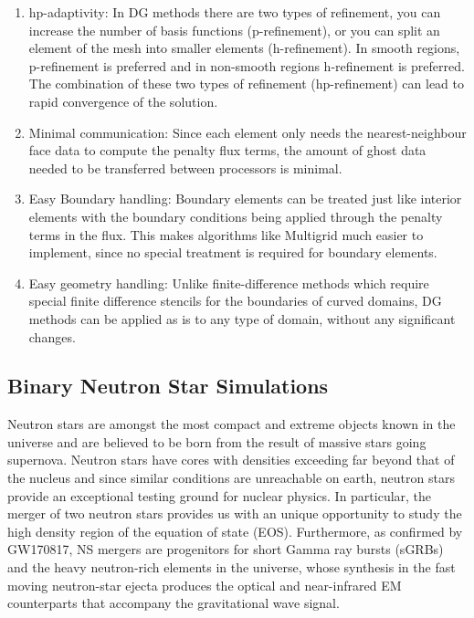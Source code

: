 \begin{enumerate}
\item hp-adaptivity: In DG methods there are two types of refinement, you can increase the number of basis functions (p-refinement), or you can split an element of the mesh into smaller elements (h-refinement). In smooth regions, p-refinement is preferred and in non-smooth regions h-refinement is preferred. The combination of these two types of refinement (hp-refinement) can lead to rapid convergence of the solution.
\item Minimal communication: Since each element only needs the nearest-neighbour face data to compute the penalty flux terms, the amount of ghost data needed to be transferred between processors is minimal.
\item Easy Boundary handling: Boundary elements can be treated just like interior elements with the boundary conditions being applied through the penalty terms in the flux. This makes algorithms like Multigrid much easier to implement, since no special treatment is required for boundary elements.
\item Easy geometry handling: Unlike finite-difference methods which require special finite difference stencils for the boundaries of curved domains, DG methods can be applied as is to any type of domain, without any significant changes.
\end{enumerate}

\subsection{Binary Neutron Star Simulations}

Neutron stars are amongst the most compact and extreme objects known in
the universe and are believed to be born from the result of
massive stars going supernova. Neutron stars have cores with densities exceeding far beyond that
of the nucleus and since similar conditions are unreachable on earth, neutron stars provide an exceptional testing ground for nuclear physics. In particular, the merger of two neutron stars provides us with an unique opportunity to study the high density region of the equation of state (EOS). Furthermore, as confirmed by GW170817, NS mergers are progenitors for short Gamma ray bursts (sGRBs) and the
heavy neutron-rich elements in the universe, whose synthesis in the fast moving neutron-star ejecta produces the optical and near-infrared EM counterparts that accompany the gravitational wave signal.

